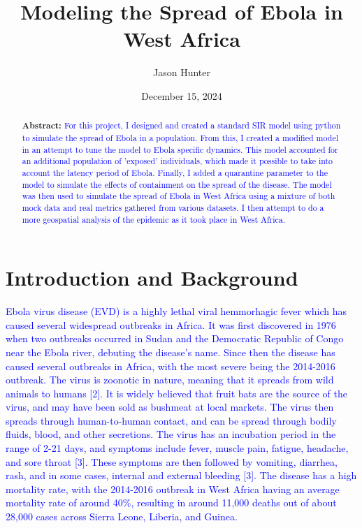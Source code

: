\documentclass[%
 reprint,
superscriptaddress,
 amsmath,amssymb,
 aps,
floatfix,
]{revtex4-2}
\begin{document}
\title{Modeling the Spread of Ebola in West Africa} %

\author{Jason Hunter}


\date{December 15, 2024}%

\begin{abstract}
{\bf Abstract:} \textcolor{blue}{
    For this project, I designed and created a standard SIR model using python to simulate the spread of Ebola in a population. 
    From this, I created a modified model in an attempt to tune the model to Ebola specific dynamics. 
    This model accounted for an additional population of 'exposed' individuals, which made it possible to take into account the latency period of Ebola. 
    Finally, I added a quarantine parameter to the model to simulate the effects of containment on the spread of the disease. 
    The model was then used to simulate the spread of Ebola in West Africa using a mixture of both mock data and real metrics gathered from various datasets. 
    I then attempt to do a more geospatial analysis of the epidemic as it took place in West Africa.}
\end{abstract}

\maketitle

\section{Introduction and Background}

\textcolor{blue}{ 
    Ebola virus disease (EVD) is a highly lethal viral hemmorhagic fever which has caused several widespread outbreaks in Africa.
    It was first discovered in 1976 when two outbreaks occurred in Sudan and the Democratic Republic of Congo near the Ebola river, debuting the disease's name.
    Since then the disease has caused several outbreaks in Africa, with the most severe being the 2014-2016 outbreak. 
    The virus is zoonotic in nature, meaning that it spreads from wild animals to humans [2].
    It is widely believed that fruit bats are the source of the virus, and may have been sold as bushmeat at local markets. 
    The virus then spreads through human-to-human contact, and can be spread through bodily fluids, blood, and other secretions. 
    The virus has an incubation period in the range of 2-21 days, and symptoms include fever, muscle pain, fatigue, headache, and sore throat [3].
    These symptoms are then followed by vomiting, diarrhea, rash, and in some cases, internal and external bleeding [3].
    The disease has a high mortality rate, with the 2014-2016 outbreak in West Africa having an average mortality rate of around 40\%, resulting in around 11,000 deaths out of about 28,000 cases across Sierra Leone, Liberia, and Guinea.}
\end{document}
